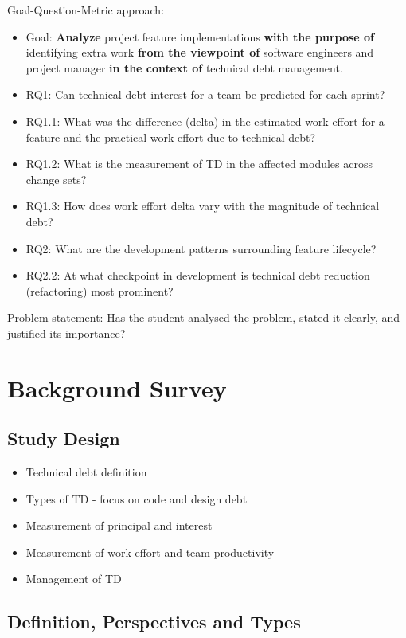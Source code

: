 \documentclass{mprop}
\begin{document}
Goal-Question-Metric approach:
\begin{itemize}
	\item Goal: \textbf{Analyze} project feature implementations \textbf{with
		      the purpose of} identifying extra work \textbf{from the viewpoint of}
	      software engineers and project manager \textbf{in the context of}
	      technical debt management.
	\item RQ1: Can technical debt interest for a team be predicted for each
	      sprint?
	\item RQ1.1: What was the difference (delta) in the estimated work effort
	      for a feature and the practical work effort due to technical debt?
	\item RQ1.2: What is the measurement of TD in the affected modules across
	      change sets?
	\item RQ1.3: How does work effort delta vary with the magnitude of
	      technical debt?
	\item RQ2: What are the development patterns surrounding feature
	      lifecycle?
	\item RQ2.2: At what checkpoint in development is technical debt reduction
	      (refactoring)  most prominent?
\end{itemize}

Problem statement: Has the student analysed the problem, stated it clearly, and
justified its importance?

\section{Background Survey}

\subsection{Study Design}

\begin{itemize}
	\item Technical debt definition
	\item Types of TD - focus on code and design debt
	\item Measurement of principal and interest
	\item Measurement of work effort and team productivity
	\item Management of TD
\end{itemize}

\subsection{Definition, Perspectives and Types}
\label{section:def}
\end{document}
